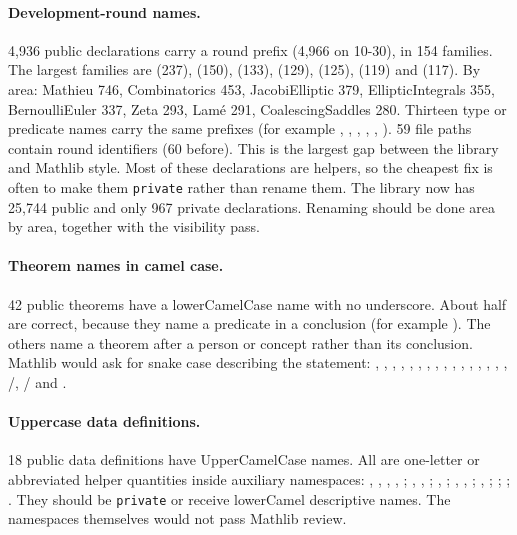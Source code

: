 \documentclass[11pt,a4paper]{article}
\begin{document}
\paragraph{Development-round names.}
4{,}936 public declarations carry a round prefix (4{,}966 on 10-30), in 154 families. The
largest families are  (237),  (150),  (133), 
(129),  (125),  (119) and  (117). By area: Mathieu
746, Combinatorics 453, JacobiElliptic 379, EllipticIntegrals 355, BernoulliEuler 337, Zeta
293, Lam\'e 291, CoalescingSaddles 280. Thirteen type or predicate names carry the same
prefixes (for example , , ,
, , ). 59 file paths contain round
identifiers (60 before). This is the largest gap between the library and Mathlib style. Most
of these declarations are helpers, so the cheapest fix is often to make them
\texttt{private} rather than rename them. The library now has 25{,}744 public and only 967
private declarations. Renaming should be done area by area, together with the visibility
pass.

\paragraph{Theorem names in camel case.}
42 public theorems have a lowerCamelCase name with no underscore. About half are correct,
because they name a predicate in a conclusion (for example ). The
others name a theorem after a person or concept rather than its conclusion. Mathlib would
ask for snake case describing the statement:
, , ,
, ,
, ,
, ,
, , ,
, ,
, ,
/, / and
.

\paragraph{Uppercase data definitions.}
18 public data definitions have UpperCamelCase names. All are one-letter or abbreviated
helper quantities inside auxiliary namespaces: , , ,
, ; , , ; ,
; , , ; , ;
; ; . They should be
\texttt{private} or receive lowerCamel descriptive names. The  namespaces
themselves would not pass Mathlib review.
\end{document}

